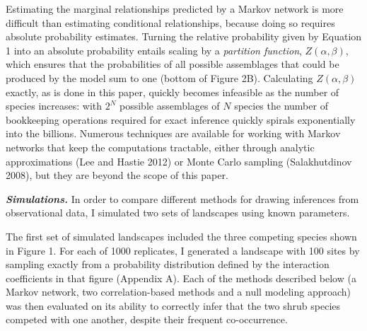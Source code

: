 \documentclass[12pt,]{article}
\begin{document}
\begin{spacing}{1.9}
\begin{flushleft}
Estimating the marginal relationships predicted by a Markov network is
more difficult than estimating conditional relationships, because doing
so requires absolute probability estimates. Turning the relative
probability given by Equation 1 into an absolute probability entails
scaling by a \emph{partition function}, \(Z(\alpha, \beta)\), which
ensures that the probabilities of all possible assemblages that could be
produced by the model sum to one (bottom of Figure 2B). Calculating
\(Z(\alpha, \beta)\) exactly, as is done in this paper, quickly becomes
infeasible as the number of species increases: with \(2^N\) possible
assemblages of \(N\) species the number of bookkeeping operations
required for exact inference quickly spirals exponentially into the
billions. Numerous techniques are available for working with Markov
networks that keep the computations tractable, either through analytic
approximations (Lee and Hastie 2012) or Monte Carlo sampling
(Salakhutdinov 2008), but they are beyond the scope of this paper.

\textbf{\emph{Simulations.}} In order to compare different methods for
drawing inferences from observational data, I simulated two sets of
landscapes using known parameters.

The first set of simulated landscapes included the three competing
species shown in Figure 1. For each of 1000 replicates, I generated a
landscape with 100 sites by sampling exactly from a probability
distribution defined by the interaction coefficients in that figure
(Appendix A). Each of the methods described below (a Markov network, two
correlation-based methods and a null modeling approach) was then
evaluated on its ability to correctly infer that the two shrub species
competed with one another, despite their frequent co-occurrence.


\end{flushleft}
\end{spacing}
\end{document}
